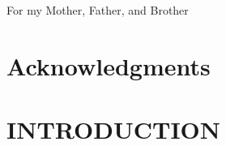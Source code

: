 \documentclass[fullpage, hidelinks]{uiucthesis2009}
\begin{document}

\begin{dedication}
For my Mother, Father, and Brother
\end{dedication}


%


\chapter*{Acknowledgments}


\tableofcontents
%
%
%
%

\mainmatter

\chapter{INTRODUCTION}
\label{sec:theory}

\clearpage
\end{document}
